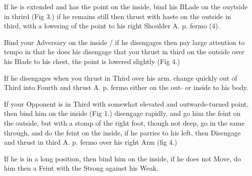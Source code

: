 \newpage


\newpage


\exercise{}
If he is extended and has the point on the inside, bind his BLade on
the ouytside in thrird (Fig 3.) if he remains still then thrust with
haste on the outside in third, with a lowering of the point to his
right Shoulder A. p. fermo (4).

\exercise{}
Bind your Adversary on the inside / if he disengages then pay large
attention to tempo in that he does his disengage that you thrust in
third on the outside over his Blade to his chest, the point is lowered
slightly (Fig 4.)

If he disengages when you thrust in Third over his arm, change quickly
out of Third into Fourth and thrust A. p. fermo either on the out- or
inside to his body.

\exercise{}
If your Opponent is in Third with somewhat elevated and outwards-turned
point, then bind him on the inside (Fig 1.) disengage rapidly, and go
him the feint on the outside, but with a stomp of the right foot,
though not deep, go in the same through, and do the feint on the
inside, if he parries to his left, then Disengage and thrust in third
A. p. fermo over his right Arm (fig 4.)

\exercise{}
If he is in a long position, then bind him on the inside, if he does
not Move, do him then a Feint with the Strong against his Weak.
